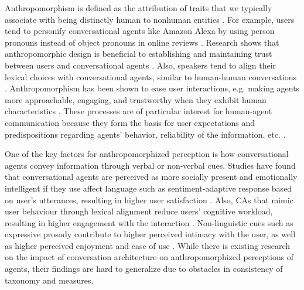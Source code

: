 \documentclass[sigconf,screen,review, anonymous]{acmart}
\begin{document}
Anthropomorphism is defined as the attribution of traits that we typically associate with being distinctly human to nonhuman entities \cite{waytz2010sees}. For example, users tend to personify conversational agents like Amazon Alexa by using person pronouns instead of object pronouns in online reviews \cite{purington2017alexa}.  Research shows that anthropomorphic design is beneficial to establishing and maintaining trust between users and conversational agents \cite{seeger2021chatbots}. Also, speakers tend to align their lexical choices with conversational agents, similar to human-human conversations \cite{cowan2015does}. Anthropomorphism has been shown to ease user interactions, e.g. making agents more approachable, engaging, and trustworthy when they exhibit human characteristics \cite{qiu2009evaluating}. These processes are of particular interest for human-agent communication because they form the basis for user expectations and predispositions regarding agents' behavior, reliability of the information, etc. \cite{kuzminykh2020genie}.

One of the key factors for anthropomorphized perception is how conversational agents convey information through verbal or non-verbal cues. Studies have found that conversational agents are perceived as more socially present and emotionally intelligent if they use affect language such as sentiment-adaptive response based on user's utterances, resulting in higher user satisfaction \cite{diederich2019emulating}\cite{yang2017perceived}. Also, CAs that mimic user behaviour through lexical alignment reduce users' cognitive workload, resulting in higher engagement with the interaction \cite{spillner2021talk}. Non-linguistic cues such as expressive prosody contribute to higher perceived intimacy with the user, as well as higher perceived enjoyment and ease of use \cite{kim2020can}. While there is existing research on the impact of conversation architecture on anthropomorphized perceptions of agents, their findings are hard to generalize due to obstacles in consistency of taxonomy and measures.
\end{document}
